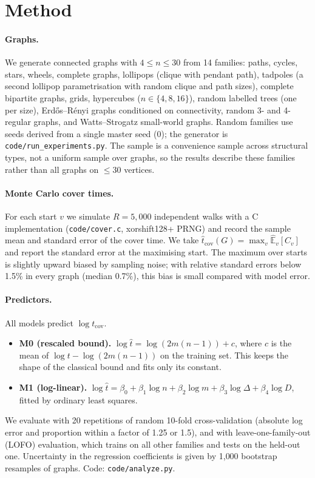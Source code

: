 \documentclass{article}
\begin{document}
\section{Method}
\label{sec:method}
\paragraph{Graphs.} We generate connected graphs with $4\le n\le 30$ from 14 families: paths, cycles, stars, wheels, complete graphs, lollipops (clique with pendant path), tadpoles (a second lollipop parametrisation with random clique and path sizes), complete bipartite graphs, grids, hypercubes ($n\in\{4,8,16\}$), random labelled trees (one per size), Erd\H{o}s--R\'enyi graphs conditioned on connectivity, random 3- and 4-regular graphs, and Watts--Strogatz small-world graphs. Random families use seeds derived from a single master seed (0); the generator is \texttt{code/run\_experiments.py}. The sample is a convenience sample across structural types, not a uniform sample over graphs, so the results describe these families rather than all graphs on $\le 30$ vertices.

\paragraph{Monte Carlo cover times.} For each start $v$ we simulate $R=5{,}000$ independent walks with a C implementation (\texttt{code/cover.c}, xorshift128+ PRNG) and record the sample mean and standard error of the cover time. We take $\hat t_{\mathrm{cov}}(G)=\max_v \hat{\mathbb{E}}_v[C_v]$ and report the standard error at the maximising start. The maximum over starts is slightly upward biased by sampling noise; with relative standard errors below 1.5\% in every graph (median 0.7\%), this bias is small compared with model error.

\paragraph{Predictors.} All models predict $\log t_{\mathrm{cov}}$.
\begin{itemize}
\item \textbf{M0 (rescaled bound).} $\log \hat t = \log(2m(n-1)) + c$, where $c$ is the mean of $\log t-\log(2m(n-1))$ on the training set. This keeps the shape of the classical bound and fits only its constant.
\item \textbf{M1 (log-linear).} $\log \hat t = \beta_0+\beta_1\log n+\beta_2\log m+\beta_3\log\Delta+\beta_4\log D$, fitted by ordinary least squares.
\end{itemize}
We evaluate with 20 repetitions of random 10-fold cross-validation (absolute log error and proportion within a factor of 1.25 or 1.5), and with leave-one-family-out (LOFO) evaluation, which trains on all other families and tests on the held-out one. Uncertainty in the regression coefficients is given by 1{,}000 bootstrap resamples of graphs. Code: \texttt{code/analyze.py}.
\end{document}
